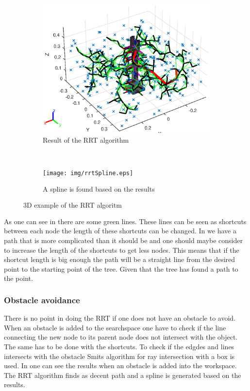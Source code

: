 \begin{figure}[htbp]
    \centering
    \begin{subfigure}[htbp]{0.45\textwidth}
        \centering
        \includegraphics[width = \picsSiz\linewidth]{img/rrt3dex.eps}
        \caption{Result of the RRT algorithm}
        \label{fig:rrt3dex}
    \end{subfigure}
    ~ 
    \begin{subfigure}[htbp]{0.45\textwidth}
        \centering
        \texttt{[image: img/rrtSpline.eps]}
        \caption{A spline is found based on the results}
        \label{fig:rrtSpline}
    \end{subfigure}
    \caption{3D example of the RRT algoritm}
    \label{fig:rrtsuper}
\end{figure}
 As one can see in  there are some green lines. These lines can be seen as shortcuts between each node the length of these shortcuts can be changed. In  we have a path that is more complicated than it should be and one should maybe consider to increase the length of the shortcuts to get less nodes. This means that if the shortcut length is big enough the path will be a straight line from the desired point to the starting point of the tree. Given that the tree has found a path to the point. 
 
 \subsubsection{Obstacle avoidance}
 There is no point in doing the RRT if one does not have an obstacle to avoid. When an obstacle is added to the searchspace one have to check if the line connecting the new node to its parent node does not intersect with the object. The same has to be done with the shortcuts. To check if the edgdes and lines intersects with the obstacle Smits algorithm for ray intersection with a box is used\cite{Smits,Intersection}. In  one can see the results when an obstacle is added into the workspace. The RRT algorithm finds as decent path and a spline is generated based on the results. 

